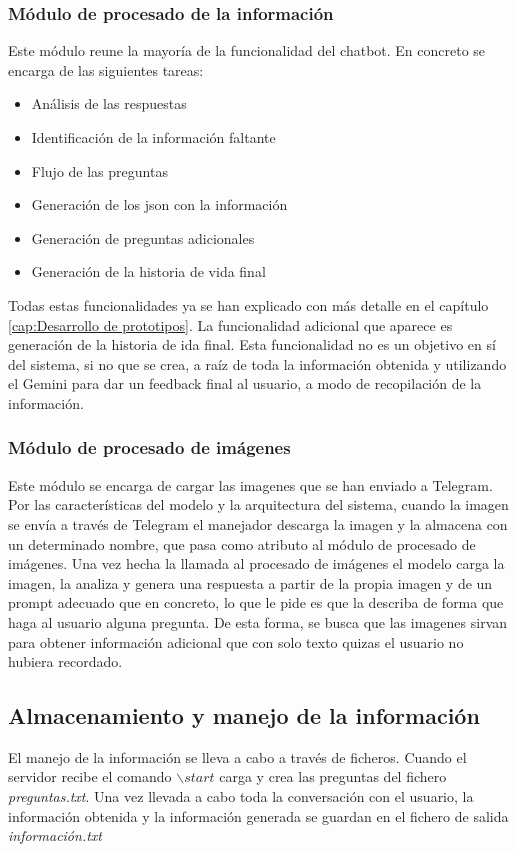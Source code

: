 \subsubsection{Módulo de procesado de la información}
Este módulo reune la mayoría de la funcionalidad del chatbot. En concreto se encarga de las siguientes tareas: 
\begin{itemize}
	\item Análisis de las respuestas 
	\item Identificación de la información faltante
	\item Flujo de las preguntas
	\item Generación de los json con la información
	\item Generación de preguntas adicionales 
	 \item Generación de la historia de vida final
\end{itemize}
Todas estas funcionalidades ya se han explicado con más detalle en el capítulo \ref{cap:Desarrollo de prototipos}. La funcionalidad adicional que aparece es generación de la historia de ida final. Esta funcionalidad no es un objetivo en sí del sistema, si no que se crea, a raíz de toda la información obtenida y utilizando el Gemini para dar un feedback final al usuario, a modo de recopilación de la información.
\subsubsection{Módulo de procesado de imágenes}
Este módulo se encarga de cargar las imagenes que se han enviado a Telegram. Por las características del modelo y la arquitectura del sistema, cuando la imagen se envía a través de Telegram el manejador descarga la imagen y la almacena con un determinado nombre, que pasa como atributo al módulo de procesado de imágenes. Una vez hecha la llamada al procesado de imágenes el modelo carga la imagen, la analiza y genera una respuesta a partir de la propia imagen y de un prompt adecuado que en concreto, lo que le pide es que la describa de forma que haga al usuario alguna pregunta. De esta forma, se busca que las imagenes sirvan para obtener información adicional que con solo texto quizas el usuario no hubiera recordado. 

\subsection{Almacenamiento y manejo de la información}

El manejo de la información se lleva a cabo a través de ficheros. Cuando el servidor recibe el comando $\backslash start$ carga y crea las preguntas del fichero \textit{preguntas.txt}. Una vez llevada a cabo toda la conversación con el usuario, la información obtenida y la información generada se guardan en el fichero de salida \textit{información.txt}

